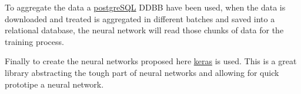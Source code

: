 To aggregate the data a \href{https://www.postgresql.org/}{postgreSQL} DDBB have been used, when the data is downloaded and treated is aggregated in different batches and saved into a relational database, the neural network will read those chunks of data for the training process.

Finally to create the neural networks proposed here \href{https://keras.io/}{keras} is used. This is a great library abstracting the tough part of neural networks and allowing for quick prototipe a neural network. 

\blindtext

\blindtext

\blindtext

\blindtext

\blindtext

\blindtext

\blindtext

\blindtext

\blindtext

\blindtext

\blindtext



